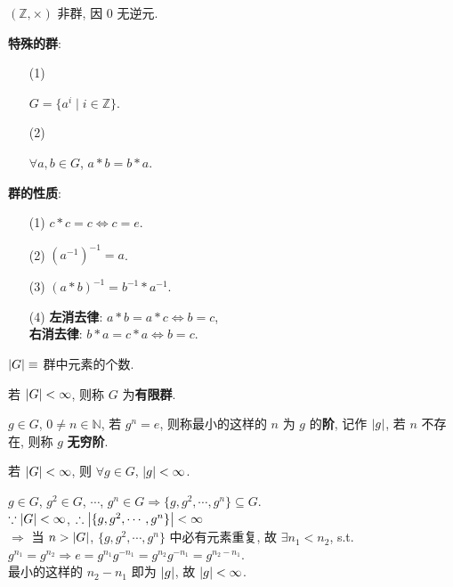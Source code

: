 \documentclass{note}
\begin{document}
\begin{eg}
    $(\mathbb{Z},\times)$ 非群, 因 $0$ 无逆元.
\end{eg}

\textbf{特殊的群}:
\begin{itemize}
    \item[(1)] \begin{eg}[循环群]
        $G=\{a^i\mid i\in\mathbb{Z}\}$.
    \end{eg}
    \item[(2)] \begin{eg}
        $\forall a,b\in G$, $a*b=b*a$.
    \end{eg}
\end{itemize}

\textbf{群的性质}:
\begin{itemize}
    \item[(1)] $c*c=c\Longleftrightarrow c=e$.
    \item[(2)] $(a^{-1})^{-1}=a$.
    \item[(3)] $(a*b)^{-1}=b^{-1}*a^{-1}$.
    \item[(4)] \textbf{左消去律}: $a*b=a*c\Longleftrightarrow b=c$,\\
    \textbf{右消去律}: $b*a=c*a\Longleftrightarrow b=c$.
\end{itemize}

\begin{df}[群的阶]
    $\left\lvert G\right\rvert\equiv$ 群中元素的个数.
\end{df}

\begin{df}[有限群]
    若 $\left\lvert G\right\rvert<\infty$, 则称 $G$ 为\textbf{有限群}.
\end{df}

\begin{df}[群元素的阶]
    $g\in G$, $0\neq n\in\mathbb{N}$, 若 $g^n=e$, 则称最小的这样的 $n$ 为 $g$ 的\textbf{阶}, 记作 $\left\lvert g\right\rvert$, 若 $n$ 不存在, 则称 $g$ \textbf{无穷阶}.
\end{df}

若 $\left\lvert G\right\rvert<\infty$, 则 $\forall g\in G$, $\left\lvert g\right\rvert<\infty$.
\begin{pf}
    $g\in G$, $g^2\in G$, $\cdots$, $g^n\in G\Longrightarrow\{g,g^2,\cdots,g^n\}\subseteq G$.\\
    $\because\left\lvert G\right\rvert<\infty$, $\therefore\left\lvert\{g,g^2,\cdots,g^n\}\right\rvert<\infty$\\
    $\Longrightarrow$ 当 $n>\left\lvert G\right\rvert$, $\{g,g^2,\cdots,g^n\}$ 中必有元素重复, 故 $\exists n_1<n_2$, s.t. $g^{n_1}=g^{n_2}\Longrightarrow e=g^{n_1}g^{-n_1}=g^{n_2}g^{-n_1}=g^{n_2-n_1}$.\\
    最小的这样的 $n_2-n_1$ 即为 $\left\lvert g\right\rvert$, 故 $\left\lvert g\right\rvert<\infty$.
\end{pf}
\end{document}
